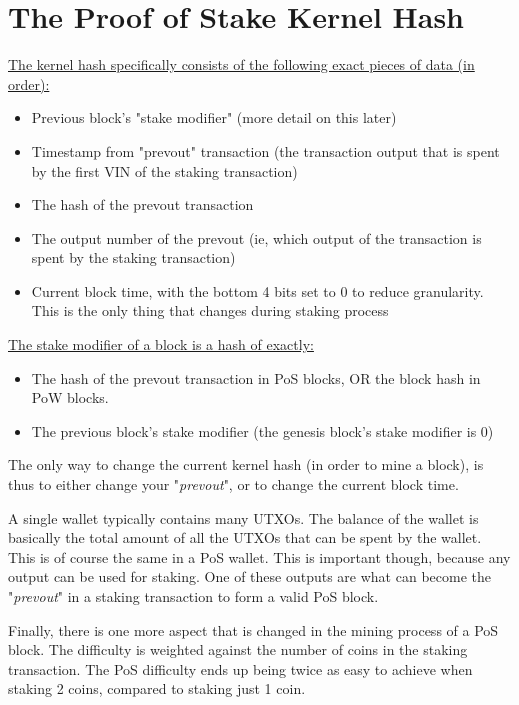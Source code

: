 \section{The Proof of Stake Kernel Hash}

\underline{The kernel hash specifically consists of the following exact pieces of data (in order):}

\begin{itemize}
    \item Previous block's "stake modifier" (more detail on this later)
    \item Timestamp from "prevout" transaction (the transaction output that 
    is spent by the first VIN of the staking transaction)
    \item The hash of the prevout transaction
    \item The output number of the prevout (ie, which output of the 
    transaction is spent by the staking transaction)
    \item Current block time, with the bottom 4 bits set to 0 to reduce 
    granularity. This is the only thing that changes during staking process
\end{itemize}



\underline{The stake modifier of a block is a hash of exactly:}
\begin{itemize}
    \item The hash of the prevout transaction in PoS blocks, OR the block 
    hash in PoW blocks.
    \item The previous block's stake modifier (the genesis block's stake 
    modifier is 0)
\end{itemize}



The only way to change the current kernel hash (in order to mine a block), 
is thus to either change your "\textit{prevout}", or to change the current 
block time.



A single wallet typically contains many UTXOs. The balance of the wallet is 
basically the total amount of all the UTXOs that can be spent by the wallet. 
This is of course the same in a PoS wallet. This is important though, because 
any output can be used for staking. One of these outputs are what can become 
the "\textit{prevout}" in a staking transaction to form a valid PoS block.



Finally, there is one more aspect that is changed in the mining process of a 
PoS block. The difficulty is weighted against the number of coins in the 
staking transaction. The PoS difficulty ends up being twice as easy to achieve 
when staking 2 coins, compared to staking just 1 coin.



